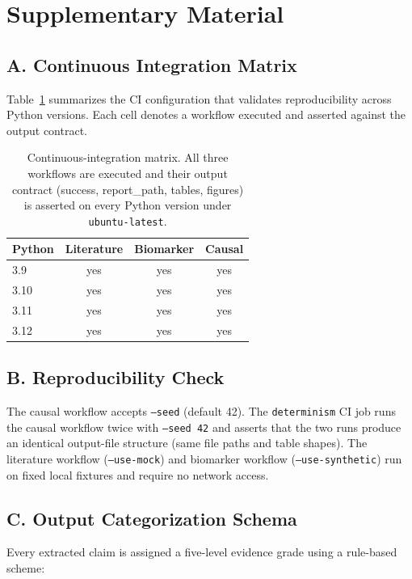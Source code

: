 \section{Supplementary Material}
\label{sec:supp}

\subsection{A. Continuous Integration Matrix}
Table~\ref{tab:ci} summarizes the CI configuration that validates reproducibility
across Python versions. Each cell denotes a workflow executed and asserted against
the output contract.

\begin{table}[h]
\centering
\caption{Continuous-integration matrix. All three workflows are executed and their
output contract (success, report\_path, tables, figures) is asserted on every
Python version under \texttt{ubuntu-latest}.}
\label{tab:ci}
\begin{tabular}{lccc}
\toprule
Python & Literature & Biomarker & Causal \\
\midrule
3.9  & yes & yes & yes \\
3.10 & yes & yes & yes \\
3.11 & yes & yes & yes \\
3.12 & yes & yes & yes \\
\bottomrule
\end{tabular}
\end{table}

\subsection{B. Reproducibility Check}
The causal workflow accepts \texttt{--seed} (default 42). The \texttt{determinism}
CI job runs the causal workflow twice with \texttt{--seed 42} and asserts that the
two runs produce an identical output-file structure (same file paths and table
shapes). The literature workflow (\texttt{--use-mock}) and biomarker workflow
(\texttt{--use-synthetic}) run on fixed local fixtures and require no
network access.

\subsection{C. Output Categorization Schema}
Every extracted claim is assigned a five-level evidence grade using a rule-based scheme:


